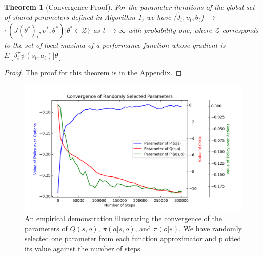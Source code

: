 \documentclass[letterpaper]{article} %
\newtheorem{theorem}{Theorem}
\begin{document}
\begin{theorem}[Convergence Proof]
\label{conv}
For the parameter iterations of the global set of shared parameters defined in Algorithm 1, we have ($\hat{J}_{t}, \upsilon_{t}, \theta_{t} $) $\to$ $\{(J(\theta^{*})_{t}, \upsilon^{*}, \theta^{*} )|\theta^{*} \in \mathcal{Z}\}$ as t $\to \infty$ with probability one, where $\mathcal{Z}$ corresponds to the set of local maxima of a performance function whose gradient is $E[\delta^{\pi}_{t}\psi(s_{t},a_{t})|\theta]$
\end{theorem}

 
\begin{proof}
The proof for this theorem is in the Appendix.
\end{proof}

\begin{figure}[t]
\centering
\includegraphics[width=0.9\columnwidth]{MultiPlot.png} %
\caption{An empirical demonstration illustrating the convergence of the parameters of $Q(s,o)$, $\pi(a|s,o)$, and $\pi(o|s)$. We have randomly selected one parameter from each function approximator and plotted its value against the number of steps.}
\label{fig2}
\end{figure}
\end{document}
